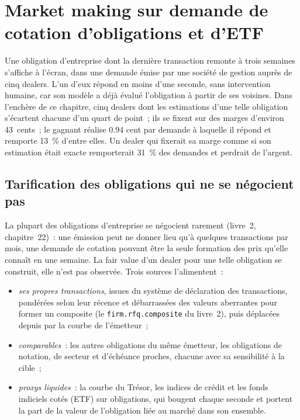 \chapter{Market making sur demande de cotation d'obligations et d'ETF}\label{ch:hf:bond-and-etf-request-for-quote-market-making}

Une obligation d'entreprise dont la dernière transaction remonte à trois semaines s'affiche à l'écran, dans une demande émise par une société de gestion auprès de cinq dealers. L'un d'eux répond en
moins d'une seconde, sans intervention humaine, car son modèle a déjà évalué l'obligation à partir de ses voisines. Dans l'enchère de ce chapitre, cinq dealers dont les
estimations d'une telle obligation s'écartent chacune d'un quart de point~; ils se fixent sur des marges d'environ 43~cents~; le gagnant réalise 0.94 cent par demande à laquelle il
répond et remporte 13~\% d'entre elles. Un dealer qui fixerait sa marge comme si son estimation était exacte remporterait 31~\% des demandes et perdrait de l'argent.

\section{Tarification des obligations qui ne se négocient pas}

La plupart des obligations d'entreprise se négocient rarement (livre~2, chapitre~22)~: une émission peut ne donner lieu qu'à quelques transactions par mois, une demande de cotation pouvant être la seule
formation des prix qu'elle connaît en une semaine. La fair value d'un dealer pour une telle obligation se construit, elle n'est pas observée. Trois sources l'alimentent~:

\begin{itemize}
\item \begin{sloppypar}\emph{ses propres transactions}, issues du système de déclaration des transactions, pondérées selon leur récence et débarrassées des valeurs aberrantes pour former un composite (le
\texttt{firm.rfq.composite} du livre~2), puis déplacées depuis par la courbe de l'émetteur~;\end{sloppypar}
\item \emph{comparables}~: les autres obligations du même émetteur, les obligations de notation, de secteur et d'échéance proches, chacune avec sa sensibilité à la cible~;
\item \emph{proxys liquides}~: la courbe du Trésor, les indices de crédit et les fonds indiciels cotés (ETF) sur obligations, qui bougent chaque seconde et portent la part de la valeur
de l'obligation liée au marché dans son ensemble.
\end{itemize}


